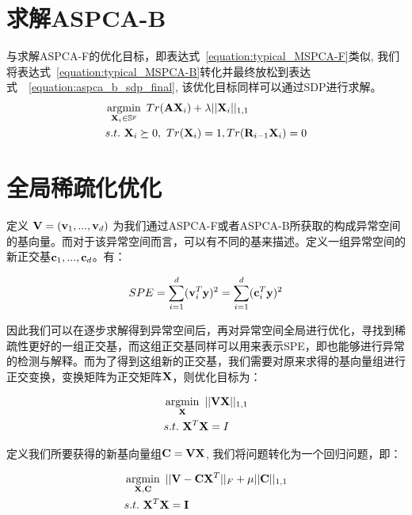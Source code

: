 \section{求解ASPCA-B}

与求解ASPCA-F的优化目标，即表达式~\ref{equation:typical_MSPCA-F}类似, 我们将表达式~\ref{equation:typical_MSPCA-B}转化并最终放松到表达式~~\ref{equation:aspca_b_sdp_final}, 该优化目标同样可以通过SDP进行求解。
\begin{equation}
\label{equation:aspca_b_sdp_final}
\begin{split}
& \operatorname*{arg min}_{{\bf X}_i \in \mathbb{S}^p}\ Tr({\bf A}{\bf X}_i)+\lambda ||{\bf X}_i||_{1,1}\\
& s.t.\ {\bf X}_i\succeq0,\ Tr({\bf X}_i)=1, Tr({\bf R}_{i-1}{\bf X}_i)=0\\
\end{split}
\end{equation}

\section{全局稀疏化优化}
定义 ${\bf V}=({\bf v}_1,...,{\bf v}_d)$ 为我们通过ASPCA-F或者ASPCA-B所获取的构成异常空间的基向量。而对于该异常空间而言，可以有不同的基来描述。定义一组异常空间的新正交基${{\bf c}_1,...,{\bf c}_d}$。有：

\begin{equation}
SPE= \sum_{i=1}^{d}({\bf v}_i^T {\bf y})^2 = \sum_{i=1}^{d}({\bf c}_i^T {\bf y})^2
\end{equation}

因此我们可以在逐步求解得到异常空间后，再对异常空间全局进行优化，寻找到稀疏性更好的一组正交基，而这组正交基同样可以用来表示SPE，即也能够进行异常的检测与解释。而为了得到这组新的正交基，我们需要对原来求得的基向量组进行正交变换，变换矩阵为正交矩阵${\bf X}$，则优化目标为：

\begin{equation}
\begin{split}
&\operatorname*{arg min}_{{\bf X}}\ ||{\bf V}{\bf X}||_{1,1}\\
& s.t.\ {\bf X}^T{\bf X}=I
\end{split}
\end{equation}

定义我们所要获得的新基向量组${\bf C}={\bf V}{\bf X}$, 我们将问题转化为一个回归问题，即：

\begin{equation}
\begin{split}
&\operatorname*{arg min}_{{\bf X},{\bf C}}\ ||{\bf V}-{\bf C}{\bf X}^T||_F+\mu||{\bf C}||_{1,1}\\
&s.t.\ {\bf X}^T{\bf X}={\bf I}
\end{split}
\label{equation:step2}
\end{equation}


